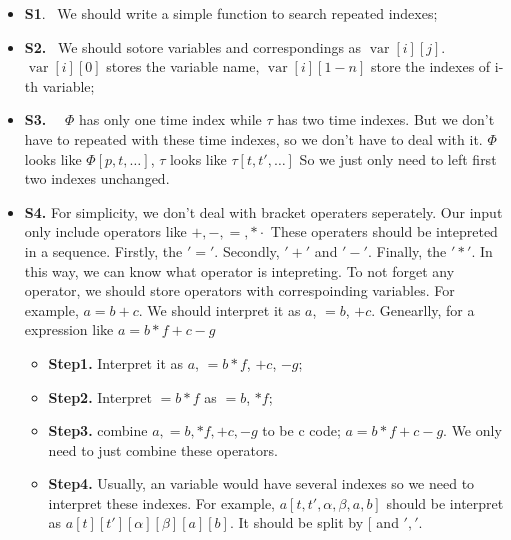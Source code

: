 \documentclass{article}
\begin{document}
\begin{itemize}
  \item {\bfseries{S1}}. \ We should write a simple function to search
  repeated indexes;
  
  \item {\bfseries{S2.}} \ We should sotore variables and correspondings as
  $\ensuremath{\operatorname{var}} [i] [j]$. $\ensuremath{\operatorname{var}}
  [i] [0]$ stores the variable name, $\ensuremath{\operatorname{var}} [i] [1 -
  n]$ store the indexes of i-th variable;
  
  \item {\bfseries{S3.}} \ \ $\Phi$ has only one time index while $\tau$ has
  two time indexes. But we don't have to repeated with these time indexes, so
  we don't have to deal with it. $\Phi$ looks like $\Phi [p, t, \ldots]$,
  $\tau$ looks like $\tau [t, t', \ldots]$ So we just only need to left first
  two indexes unchanged.
  
  \item {\bfseries{S4.}} For simplicity, we don't deal with bracket operaters
  seperately. Our input only include operators like $+, -, =, \ast \cdot$
  These operaters should be intepreted in a sequence. Firstly, the $' ='$.
  Secondly, $' +'$ and $' -'$. Finally, the $' \ast'$. In this way, we can
  know what operator is intepreting. To not forget any operator, we should
  store operators with correspoinding variables. For example, $a = b + c$. We
  should interpret it as $a$, $= b$, $+ c$. Genearlly, for a expression like
  $a = b \ast f + c - g$ \ \
  \begin{itemize}
    \item {\bfseries{Step1.}} Interpret it as $a$, $= b \ast f$, $+ c$, $- g$;
    
    \item {\bfseries{Step2.}} Interpret $= b \ast f$ as $= b$, $\ast f$;
    
    \item {\bfseries{Step3.}} combine $a, = b, \ast f, + c, - g$ to be c code;
    $a = b \ast f + c - g$. We only need to just combine these operators.
    
    \item {\bfseries{Step4.}} Usually, an variable would have several indexes
    so we need to interpret these indexes. For example, $a [t, t', \alpha,
    \beta, a, b]$ should be interpret as $a [t] [t'] [\alpha] [\beta] [a]
    [b]$. It should be split by $[ $ and $','$.
  \end{itemize}
\end{itemize}
\end{document}
